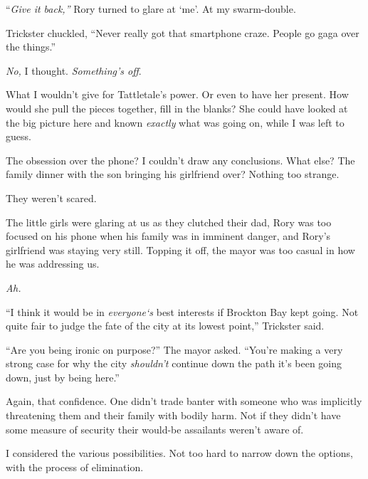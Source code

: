 ``\emph{Give it back,'' }Rory turned to glare at `me'.  At my swarm-double.



Trickster chuckled, ``Never really got that smartphone craze.  People go gaga over the things.''



\emph{No,} I thought.  \emph{Something's off}.



What I wouldn't give for Tattletale's power.  Or even to have her present.  How would she pull the pieces together, fill in the blanks?  She could have looked at the big picture here and known \emph{exactly} what was going on, while I was left to guess.



The obsession over the phone?  I couldn't draw any conclusions.  What else?  The family dinner with the son bringing his girlfriend over?  Nothing too strange.



They weren't scared.



The little girls were glaring at us as they clutched their dad, Rory was too focused on his phone when his family was in imminent danger, and Rory's girlfriend was staying very still.  Topping it off, the mayor was too casual in how he was addressing us.



\emph{Ah.}



``I think it would be in \emph{everyone}\emph{`s} best interests if Brockton Bay kept going.  Not quite fair to judge the fate of the city at its lowest point,'' Trickster said.



``Are you being ironic on purpose?'' The mayor asked.  ``You're making a very strong case for why the city \emph{shouldn't} continue down the path it's been going down, just by being here.''



Again, that confidence.  One didn't trade banter with someone who was implicitly threatening them and their family with bodily harm.  Not if they didn't have some measure of security their would-be assailants weren't aware of.



I considered the various possibilities.  Not too hard to narrow down the options, with the process of elimination.



